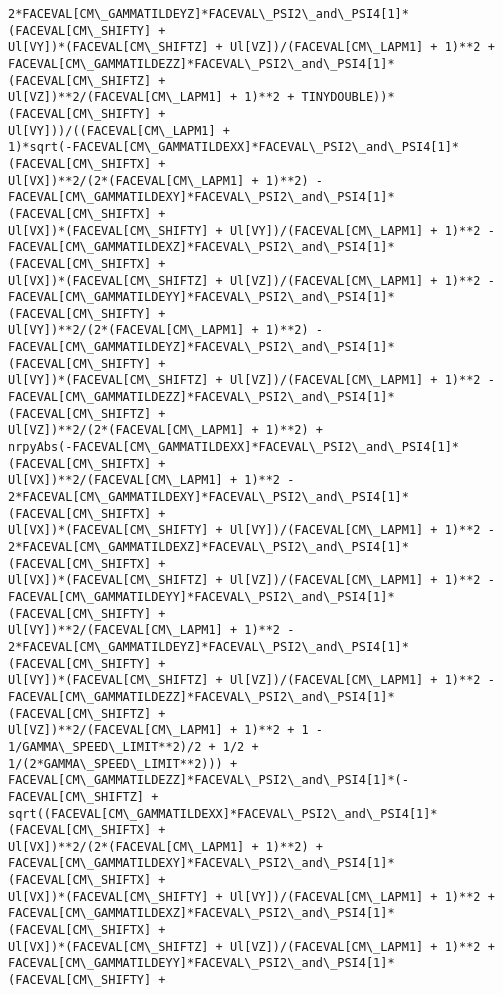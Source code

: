 \documentclass[landscape,letterpaper,10pt,english]{article}
\begin{document}
\begin{Verbatim}[commandchars=\\\{\}]
2*FACEVAL[CM\_GAMMATILDEYZ]*FACEVAL\_PSI2\_and\_PSI4[1]*(FACEVAL[CM\_SHIFTY] +
Ul[VY])*(FACEVAL[CM\_SHIFTZ] + Ul[VZ])/(FACEVAL[CM\_LAPM1] + 1)**2 +
FACEVAL[CM\_GAMMATILDEZZ]*FACEVAL\_PSI2\_and\_PSI4[1]*(FACEVAL[CM\_SHIFTZ] +
Ul[VZ])**2/(FACEVAL[CM\_LAPM1] + 1)**2 + TINYDOUBLE))*(FACEVAL[CM\_SHIFTY] +
Ul[VY]))/((FACEVAL[CM\_LAPM1] +
1)*sqrt(-FACEVAL[CM\_GAMMATILDEXX]*FACEVAL\_PSI2\_and\_PSI4[1]*(FACEVAL[CM\_SHIFTX] +
Ul[VX])**2/(2*(FACEVAL[CM\_LAPM1] + 1)**2) -
FACEVAL[CM\_GAMMATILDEXY]*FACEVAL\_PSI2\_and\_PSI4[1]*(FACEVAL[CM\_SHIFTX] +
Ul[VX])*(FACEVAL[CM\_SHIFTY] + Ul[VY])/(FACEVAL[CM\_LAPM1] + 1)**2 -
FACEVAL[CM\_GAMMATILDEXZ]*FACEVAL\_PSI2\_and\_PSI4[1]*(FACEVAL[CM\_SHIFTX] +
Ul[VX])*(FACEVAL[CM\_SHIFTZ] + Ul[VZ])/(FACEVAL[CM\_LAPM1] + 1)**2 -
FACEVAL[CM\_GAMMATILDEYY]*FACEVAL\_PSI2\_and\_PSI4[1]*(FACEVAL[CM\_SHIFTY] +
Ul[VY])**2/(2*(FACEVAL[CM\_LAPM1] + 1)**2) -
FACEVAL[CM\_GAMMATILDEYZ]*FACEVAL\_PSI2\_and\_PSI4[1]*(FACEVAL[CM\_SHIFTY] +
Ul[VY])*(FACEVAL[CM\_SHIFTZ] + Ul[VZ])/(FACEVAL[CM\_LAPM1] + 1)**2 -
FACEVAL[CM\_GAMMATILDEZZ]*FACEVAL\_PSI2\_and\_PSI4[1]*(FACEVAL[CM\_SHIFTZ] +
Ul[VZ])**2/(2*(FACEVAL[CM\_LAPM1] + 1)**2) +
nrpyAbs(-FACEVAL[CM\_GAMMATILDEXX]*FACEVAL\_PSI2\_and\_PSI4[1]*(FACEVAL[CM\_SHIFTX] +
Ul[VX])**2/(FACEVAL[CM\_LAPM1] + 1)**2 -
2*FACEVAL[CM\_GAMMATILDEXY]*FACEVAL\_PSI2\_and\_PSI4[1]*(FACEVAL[CM\_SHIFTX] +
Ul[VX])*(FACEVAL[CM\_SHIFTY] + Ul[VY])/(FACEVAL[CM\_LAPM1] + 1)**2 -
2*FACEVAL[CM\_GAMMATILDEXZ]*FACEVAL\_PSI2\_and\_PSI4[1]*(FACEVAL[CM\_SHIFTX] +
Ul[VX])*(FACEVAL[CM\_SHIFTZ] + Ul[VZ])/(FACEVAL[CM\_LAPM1] + 1)**2 -
FACEVAL[CM\_GAMMATILDEYY]*FACEVAL\_PSI2\_and\_PSI4[1]*(FACEVAL[CM\_SHIFTY] +
Ul[VY])**2/(FACEVAL[CM\_LAPM1] + 1)**2 -
2*FACEVAL[CM\_GAMMATILDEYZ]*FACEVAL\_PSI2\_and\_PSI4[1]*(FACEVAL[CM\_SHIFTY] +
Ul[VY])*(FACEVAL[CM\_SHIFTZ] + Ul[VZ])/(FACEVAL[CM\_LAPM1] + 1)**2 -
FACEVAL[CM\_GAMMATILDEZZ]*FACEVAL\_PSI2\_and\_PSI4[1]*(FACEVAL[CM\_SHIFTZ] +
Ul[VZ])**2/(FACEVAL[CM\_LAPM1] + 1)**2 + 1 - 1/GAMMA\_SPEED\_LIMIT**2)/2 + 1/2 +
1/(2*GAMMA\_SPEED\_LIMIT**2))) +
FACEVAL[CM\_GAMMATILDEZZ]*FACEVAL\_PSI2\_and\_PSI4[1]*(-FACEVAL[CM\_SHIFTZ] +
sqrt((FACEVAL[CM\_GAMMATILDEXX]*FACEVAL\_PSI2\_and\_PSI4[1]*(FACEVAL[CM\_SHIFTX] +
Ul[VX])**2/(2*(FACEVAL[CM\_LAPM1] + 1)**2) +
FACEVAL[CM\_GAMMATILDEXY]*FACEVAL\_PSI2\_and\_PSI4[1]*(FACEVAL[CM\_SHIFTX] +
Ul[VX])*(FACEVAL[CM\_SHIFTY] + Ul[VY])/(FACEVAL[CM\_LAPM1] + 1)**2 +
FACEVAL[CM\_GAMMATILDEXZ]*FACEVAL\_PSI2\_and\_PSI4[1]*(FACEVAL[CM\_SHIFTX] +
Ul[VX])*(FACEVAL[CM\_SHIFTZ] + Ul[VZ])/(FACEVAL[CM\_LAPM1] + 1)**2 +
FACEVAL[CM\_GAMMATILDEYY]*FACEVAL\_PSI2\_and\_PSI4[1]*(FACEVAL[CM\_SHIFTY] +

\end{Verbatim}
\end{document}
